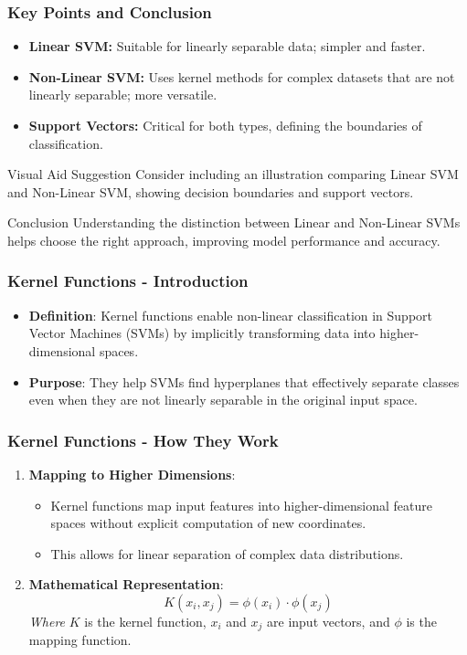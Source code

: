 \documentclass{beamer}
\begin{document}
\begin{frame}[fragile]
    \frametitle{Key Points and Conclusion}
    \begin{itemize}
        \item \textbf{Linear SVM:} Suitable for linearly separable data; simpler and faster.
        \item \textbf{Non-Linear SVM:} Uses kernel methods for complex datasets that are not linearly separable; more versatile.
        \item \textbf{Support Vectors:} Critical for both types, defining the boundaries of classification.
    \end{itemize}
    \begin{block}{Visual Aid Suggestion}
        Consider including an illustration comparing Linear SVM and Non-Linear SVM, showing decision boundaries and support vectors.
    \end{block}
    \begin{block}{Conclusion}
        Understanding the distinction between Linear and Non-Linear SVMs helps choose the right approach, improving model performance and accuracy.
    \end{block}
\end{frame}

\begin{frame}[fragile]
    \frametitle{Kernel Functions - Introduction}
    \begin{itemize}
        \item \textbf{Definition}: Kernel functions enable non-linear classification in Support Vector Machines (SVMs) by implicitly transforming data into higher-dimensional spaces.
        \item \textbf{Purpose}: They help SVMs find hyperplanes that effectively separate classes even when they are not linearly separable in the original input space.
    \end{itemize}
\end{frame}

\begin{frame}[fragile]
    \frametitle{Kernel Functions - How They Work}
    \begin{enumerate}
        \item \textbf{Mapping to Higher Dimensions}:
            \begin{itemize}
                \item Kernel functions map input features into higher-dimensional feature spaces without explicit computation of new coordinates.
                \item This allows for linear separation of complex data distributions.
            \end{itemize}
        \item \textbf{Mathematical Representation}:
            \begin{equation}
                K(x_i, x_j) = \phi(x_i) \cdot \phi(x_j)
            \end{equation}
            \noindent \textit{Where } \( K \) is the kernel function, \( x_i \) and \( x_j \) are input vectors, and \( \phi \) is the mapping function.
    \end{enumerate}
\end{frame}
\end{document}
